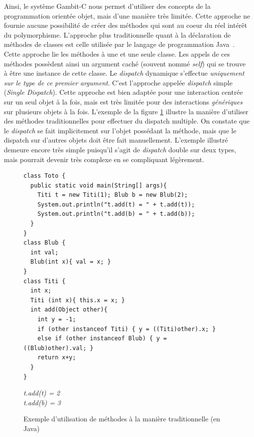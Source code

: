 \documentclass[12pt,oneside,letterpaper,francais]{book}
\begin{document}
Ainsi, le système Gambit-C nous permet d'utiliser des concepts de la
programmation orientée objet, mais d'une manière très limitée. Cette
approche ne fournie aucune possibilité de créer des méthodes qui sont
au coeur du réel intérêt du polymorphisme. L'approche plus
traditionnelle quant à la déclaration de méthodes de classes est celle
utilisée par le langage de programmation Java~\cite{JavaSpec}. Cette
approche lie les méthodes à une et une seule classe. Les appels de ces
méthodes possèdent ainsi un argument caché (souvent nommé
\textit{self}) qui se trouve à être une instance de cette classe. Le
\textit{dispatch} dynamique s'effectue \emph{uniquement sur le type de
  ce premier argument}. C'est l'approche appelée \textit{dispatch}
simple (\textit{Single Dispatch}). Cette approche est bien adaptée
pour une interaction centrée sur un seul objet à la fois, mais est
très limitée pour des interactions \emph{génériques} sur plusieurs
objets à la fois. L'exemple de la figure \ref{OO:JavaDispatch}
illustre la manière d'utiliser des méthodes traditionnelles pour
effectuer du dispatch multiple. On constate que le \textit{dispatch}
se fait implicitement sur l'objet possédant la méthode, mais que le
dispatch sur d'autres objets doit être fait manuellement. L'exemple
illustré demeure encore très simple puisqu'il s'agit de
\textit{dispatch} double sur deux types, mais pourrait devenir très
complexe en se compliquant légèrement.

\begin{figure}[htb!]
  \begin{verbatim}
class Toto {
  public static void main(String[] args){
    Titi t = new Titi(1); Blub b = new Blub(2);
    System.out.println("t.add(t) = " + t.add(t));
    System.out.println("t.add(b) = " + t.add(b));
  }
} 
class Blub {
  int val;
  Blub(int x){ val = x; }
}
class Titi {
  int x;
  Titi (int x){ this.x = x; }
  int add(Object other){
    int y = -1;
    if (other instanceof Titi) { y = ((Titi)other).x; }
    else if (other instanceof Blub) { y = ((Blub)other).val; }
    return x+y;
  }
}
  \end{verbatim}
  {{\it
t.add(t) = 2\\
t.add(b) = 3
  }}
  \caption{Exemple d'utilisation de méthodes à la manière
    traditionnelle (en Java)}
  \label{OO:JavaDispatch}
\end{figure}
\end{document}
